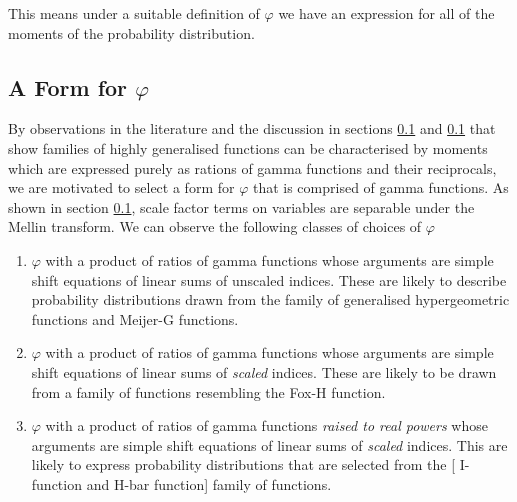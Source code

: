 \documentclass[journal=jcisd8,manuscript=article,layout=onecolumn,pdftex,floatfix,amsmath,amssymb,10pt]{achemso}
\begin{document}
This means under a suitable definition of $\varphi$ we have an expression for all of the moments of the probability distribution.
\subsection{A Form for $\varphi$}
By observations in the literature and the discussion in sections \ref{} and \ref{} that show families of highly generalised functions can be characterised by moments which are expressed purely as rations of gamma functions and their reciprocals, we are motivated to select a form for $\varphi$ that is comprised of gamma functions. As shown in section \ref{}, scale factor terms on variables are separable under the Mellin transform. We can observe the following classes of choices of $\varphi$ \begin{enumerate}
\item $\varphi$ with a product of ratios of gamma functions whose arguments are simple shift equations of linear sums of unscaled indices. These are likely to describe probability distributions drawn from the family of generalised hypergeometric functions and Meijer-G functions.
\item $\varphi$ with a product of ratios of gamma functions whose arguments are simple shift equations of linear sums of \emph{scaled} indices. These are likely to be drawn from a family of functions resembling the Fox-H function.
\item $\varphi$ with a product of ratios of gamma functions \emph{raised to real powers} whose arguments are simple shift equations of linear sums of \emph{scaled} indices. This are likely to express probability distributions that are selected from the [{\color{red} I-function and H-bar function}] family of functions.
\end{enumerate}
\end{document}
